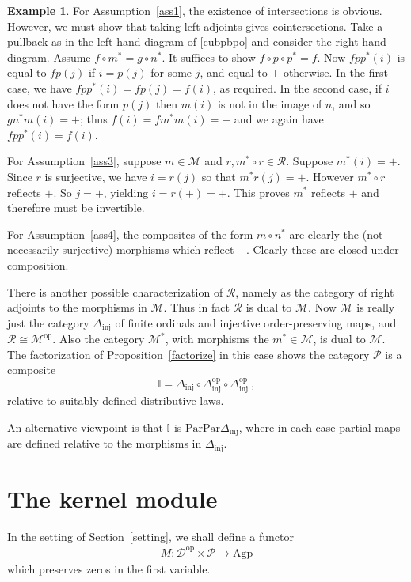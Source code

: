 \documentclass[a4paper,12pt,reqno]{amsart}
\theoremstyle{definition}
\newtheorem{example}[theorem]{Example}
\theoremstyle{fact}
\theoremstyle{genquest}
\theoremstyle{step}
\newcommand{\dd}{\colon}
\newcommand{\lra}{\longrightarrow}
\def\CD{{\mathscr D}}
\def\CM{{\mathscr M}}
\def\CP{{\mathscr P}}
\def\CR{{\mathscr R}}
\begin{document}
\begin{example}
For Assumption~\ref{ass1}, the existence of intersections is obvious.
However, we must show that taking left adjoints gives cointersections.
Take a pullback as in the left-hand diagram of \eqref{cubpbpo} 
and consider the right-hand diagram.
Assume $f\circ m^*=g\circ n^*$.
It suffices to show $f\circ p\circ p^*=f$.
Now $fpp^*(i)$ is equal to $fp(j)$ if $i=p(j)$ for some $j$, and equal to $+$ otherwise.
In the first case, we have $fpp^*(i)=fp(j)=f(i)$, as required.
In the second case, if $i$ does not have the form $p(j)$ then
$m(i)$ is not in the image of $n$, and so $gn^* m(i)=+$;
thus $f(i)=fm^*m(i)=+$ and we again have $fpp^*(i)=f(i)$.

For Assumption~\ref{ass3}, suppose $m\in \CM$ and $r, m^*\circ r\in \CR$. 
Suppose $m^*(i)=+$. 
Since $r$ is surjective, we have $i=r(j)$ so that $m^*r(j)=+$.
However $m^*\circ r$ reflects $+$. So $j=+$, yielding $i=r(+)=+$.
This proves $m^*$ reflects $+$ and therefore must be invertible.

For Assumption~\ref{ass4}, the composites of the form $m\circ n^*$
are clearly the (not necessarily surjective) morphisms which reflect $-$.
Clearly these are closed under composition.

There is another possible characterization of $\CR$, namely as the category of right adjoints to the morphisms in $\CM$. 
Thus in fact $\CR$ is dual to $\CM$. 
Now $\CM$ is really just the category $\Delta_{\mathrm{inj}}$ of finite ordinals and injective order-preserving maps, 
and $\CR \cong \CM^{\mathrm{op}}$.
Also the category $\CM^*$, with morphisms the $m^*\in \CM$, is dual to $\CM$. 
The factorization of Proposition~\ref{factorize} in this case shows the category $\CP$ is a composite 
$$\mathbb{I} = \Delta_{\mathrm{inj}}\circ \Delta_{\mathrm{inj}}^{\mathrm{op}}\circ \Delta_{\mathrm{inj}}^{\mathrm{op}} \ ,$$
relative to suitably defined distributive laws.

An alternative viewpoint is that $\mathbb{I}$ is 
$\mathrm{Par}\mathrm{Par}\Delta_{\mathrm{inj}}$,
where in each case partial maps are defined relative to the morphisms in 
$\Delta_{\mathrm{inj}}$. 
\end{example}

\section{The kernel module}\label{ker}

In the setting of Section~\ref{setting}, we shall define a functor
\begin{eqnarray}\label{moduleM}
M\dd \CD^{\mathrm{op}}\times \CP \lra \mathrm{Agp}
\end{eqnarray}
which preserves zeros in the first variable.
\end{document}
